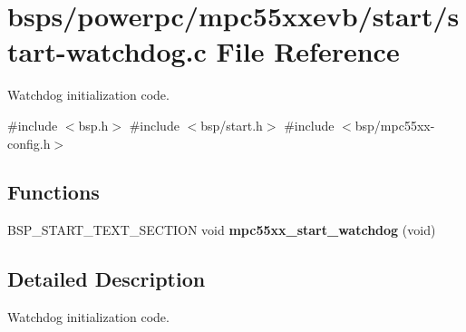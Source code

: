 \hypertarget{start-watchdog_8c}{}\section{bsps/powerpc/mpc55xxevb/start/start-\/watchdog.c File Reference}
\label{start-watchdog_8c}


Watchdog initialization code.  


{\ttfamily \#include $<$bsp.\+h$>$}\newline
{\ttfamily \#include $<$bsp/start.\+h$>$}\newline
{\ttfamily \#include $<$bsp/mpc55xx-\/config.\+h$>$}\newline
\subsection*{Functions}
\begin{DoxyCompactItemize}
\item 
\mbox{\label{start-watchdog_8c_a86d16dc7263cd8d79e116e80ab0fd79b}} 
B\+S\+P\+\_\+\+S\+T\+A\+R\+T\+\_\+\+T\+E\+X\+T\+\_\+\+S\+E\+C\+T\+I\+ON void {\bfseries mpc55xx\+\_\+start\+\_\+watchdog} (void)
\end{DoxyCompactItemize}


\subsection{Detailed Description}
Watchdog initialization code. 


